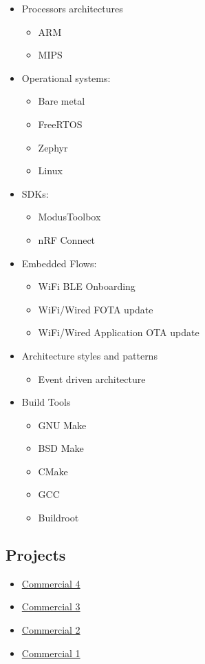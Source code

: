 \begin{itemize}
    \item Processors architectures
    \begin{itemize}
        \item ARM
        \item MIPS
    \end{itemize}

    \item Operational systems:
    \begin{itemize}
        \item Bare metal
        \item FreeRTOS
        \item Zephyr
        \item Linux
    \end{itemize}

    \item SDKs:
    \begin{itemize}
        \item ModusToolbox
        \item nRF Connect
    \end{itemize}

    \item Embedded Flows:
    \begin{itemize}
        \item WiFi BLE Onboarding
        \item WiFi/Wired FOTA update
        \item WiFi/Wired Application OTA update
    \end{itemize}

    \item Architecture styles and patterns
    \begin{itemize}
        \item Event driven architecture
    \end{itemize}

    \item Build Tools
    \begin{itemize}
        \item GNU Make
        \item BSD Make
        \item CMake
        \item GCC
        \item Buildroot
    \end{itemize}
\end{itemize}

\subsection{Projects}

\begin{itemize}
    \item \hyperlink{proj_com4}{Commercial 4}
    \item \hyperlink{proj_com3}{Commercial 3}
    \item \hyperlink{proj_com2}{Commercial 2}
    \item \hyperlink{proj_com1}{Commercial 1}
\end{itemize}

\newpage
